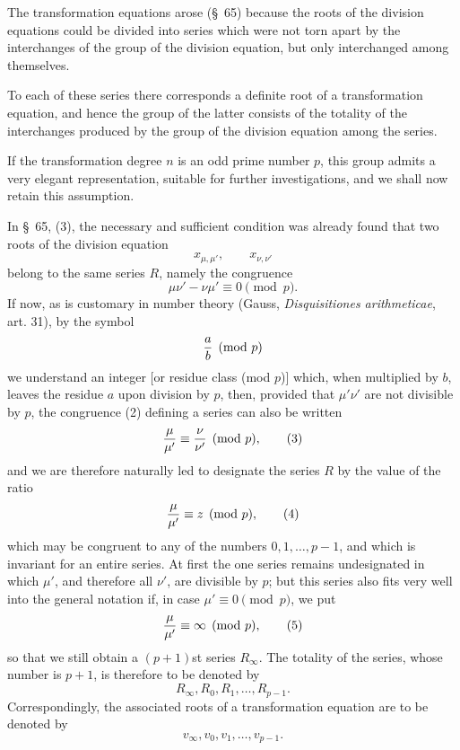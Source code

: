 \documentclass[11pt]{article}
\begin{document}
The transformation equations arose (\S~65) because the roots of the division equations could be divided into series which were not torn apart by the interchanges of the group of the division equation, but only interchanged among themselves.

To each of these series there corresponds a definite root of a transformation equation, and hence the group of the latter consists of the totality of the interchanges produced by the group of the division equation among the series.

If the transformation degree $n$ is an odd prime number $p$, this group admits a very elegant representation, suitable for further investigations, and we shall now retain this assumption.

In \S~65, (3), the necessary and sufficient condition was already found that two roots of the division equation
\begin{equation}
 x_{\mu,\mu'},\qquad x_{\nu,\nu'}
\tag{1}
\end{equation}
belong to the same series $R$, namely the congruence
\begin{equation}
 \mu\nu'-\nu\mu'\equiv0\pmod p.
\tag{2}
\end{equation}
If now, as is customary in number theory (Gauss, \emph{Disquisitiones arithmeticae}, art. 31), by the symbol
\[
 {a\over b}\pmod p
\]
we understand an integer [or residue class (mod $p$)] which, when multiplied by $b$, leaves the residue $a$ upon division by $p$, then, provided that $\mu'\nu'$ are not divisible by $p$, the congruence (2) defining a series can also be written
\begin{equation}
 {\mu\over \mu'}\equiv {\nu\over \nu'}\pmod p,
\tag{3}
\end{equation}
and we are therefore naturally led to designate the series $R$ by the value of the ratio
\begin{equation}
 {\mu\over \mu'}\equiv z\pmod p,
\tag{4}
\end{equation}
which may be congruent to any of the numbers $0,1,\ldots,p-1$, and which is invariant for an entire series. At first the one series remains undesignated in which $\mu'$, and therefore all $\nu'$, are divisible by $p$; but this series also fits very well into the general notation if, in case $\mu'\equiv0\pmod p$, we put
\begin{equation}
 {\mu\over \mu'}\equiv\infty\pmod p,
\tag{5}
\end{equation}
so that we still obtain a $(p+1)$st series $R_\infty$. The totality of the series, whose number is $p+1$, is therefore to be denoted by
\begin{equation}
 R_\infty,R_0,R_1,\ldots,R_{p-1}.
\tag{6}
\end{equation}
Correspondingly, the associated roots of a transformation equation are to be denoted by
\begin{equation}
 v_\infty,v_0,v_1,\ldots,v_{p-1}.
\tag{7}
\end{equation}
\end{document}
